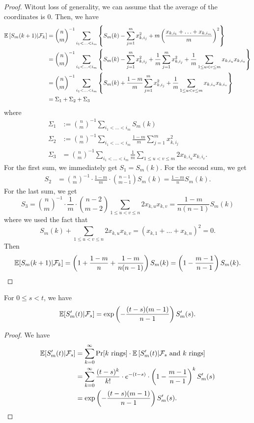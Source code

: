 \documentclass[12pt]{article}
\begin{document}
\begin{proof}
	Witout loss of generality, we can assume that the average of the coordinates is $0$. Then, we have 
	\begin{align*}
		\mathbb{E} \left [ S_m(k+1) | \mathcal{F}_k \right ] & = \binom{n}{m}^{-1} \sum_{i_1 < \ldots < i_m} \left \{ S_m(k) - \sum_{j = 1}^m x_{k, i_j}^2 + m \left ( \frac{x_{k, i_1} + \ldots + x_{k, i_m}}{m} \right )^2 \right \} \\
		& = \binom{n}{m}^{-1} \sum_{i_1 < \ldots < i_m} \left \{ S_m(k) - \sum_{j = 1}^m x_{k, i_j}^2  + \frac{1}{m} \sum_{j = 1}^m x_{k, i_j}^2 + \frac{1}{m} \sum_{1 \leq u < v \leq m} x_{k, i_u} x_{k, i_v} \right \} \\
		& = \binom{n}{m}^{-1} \sum_{i_1 < \ldots < i_m} \left \{ S_m(k) + \frac{1-m}{m} \sum_{j = 1}^m x_{k, i_j}^2 + \frac{1}{m} \sum_{1 \leq u < v \leq m} x_{k, i_u} x_{k, i_v} \right \} \\
		& = \Sigma_1 + \Sigma_2 + \Sigma_3
	\end{align*}
	where 
	\begin{align*}
		\Sigma_1 & := \binom{n}{m}^{-1} \sum_{i_1 < \ldots < i_m} S_m(k) \\
		\Sigma_2 & := \binom{n}{m}^{-1} \sum_{i_1 < \ldots < i_m} \frac{1-m}{m} \sum_{j = 1}^m x_{k, i_j}^2 \\
		\Sigma_3 & = \binom{n}{m}^{-1} \sum_{i_1 < \ldots < i_m} \frac{1}{m} \sum_{1 \leq u < v \leq m} 2x_{k, i_u} x_{k, i_v}.
	\end{align*}
	For the first sum, we immediately get $S_1 = S_m(k)$. For the second sum, we get 
	\begin{align*}
		S_2 & = \binom{n}{m}^{-1} \cdot \frac{1-m}{m} \cdot \binom{n-1}{m-1} S_m(k) = \frac{1-m}{n} S_m(k). 
	\end{align*}
	For the last sum, we get 
	\[
		S_3 = \binom{n}{m}^{-1} \cdot \frac{1}{m} \cdot \binom{n-2}{m-2} \sum_{1 \leq u < v \leq n} 2x_{k, u} x_{k, v} = \frac{1-m}{n(n-1)} S_m(k)
	\]
	where we used the fact that 
	\[
		S_m(k) + \sum_{1 \leq u < v \leq n} 2x_{k, u} x_{k, v} = (x_{k, 1} + \ldots + x_{k, n})^2 = 0.	
	\]
	Then 
	\[
		\mathbb{E} [S_m(k+1) | \mathcal{F}_k] = \left ( 1 + \frac{1-m}{n} + \frac{1-m}{n(n-1)} \right ) S_m(k) = \left ( 1 - \frac{m-1}{n-1} \right ) S_m(k).	
	\]
\end{proof}

\begin{cor} \label{explicit-formula-2}
	For $0 \leq s < t$, we have 
	\[
		\mathbb{E} [S_m'(t) | \mathcal{F}_s] = \exp \left ( -\frac{(t-s)(m-1)}{n-1} \right ) S_m'(s).	
	\]
\end{cor}
\begin{proof}
	We have 
	\begin{align*}
		\mathbb{E} [ S_m'(t) | \mathcal{F}_s ] & = \sum_{k = 0}^\infty \Pr[k \text{ rings}] \cdot \mathbb{E} \left [ S_m'(t) | \mathcal{F}_s \text{ and } k \text{ rings} \right ] \\
		& = \sum_{k = 0}^\infty \frac{(t-s)^k}{k!} \cdot e^{-(t-s)} \cdot \left ( 1 - \frac{m-1}{n-1} \right )^k S_m'(s) \\
		& = \exp \left ( -\frac{(t-s)(m-1)}{n-1} \right ) S_m'(s). 
	\end{align*}
\end{proof}
\end{document}

